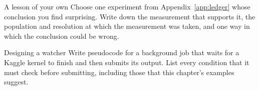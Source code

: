 \begin{exercise}{A lesson of your own}
Choose one experiment from Appendix~\ref{app:ledger} whose conclusion you find surprising. Write down the
measurement that supports it, the population and resolution at which the measurement was taken, and one
way in which the conclusion could be wrong.
\end{exercise}

\begin{exercise}{Designing a watcher}
Write pseudocode for a background job that waits for a Kaggle kernel to finish and then submits its
output. List every condition that it must check before submitting, including those that this chapter's
examples suggest.
\end{exercise}
